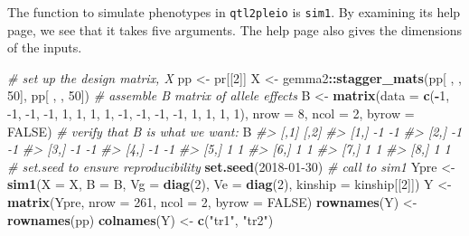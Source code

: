 \documentclass{book}
\newenvironment{Shaded}{\begin{snugshade}}{\end{snugshade}}
\newcommand{\CommentTok}[1]{\textcolor[rgb]{0.56,0.35,0.01}{\textit{#1}}}
\newcommand{\DataTypeTok}[1]{\textcolor[rgb]{0.13,0.29,0.53}{#1}}
\newcommand{\DecValTok}[1]{\textcolor[rgb]{0.00,0.00,0.81}{#1}}
\newcommand{\KeywordTok}[1]{\textcolor[rgb]{0.13,0.29,0.53}{\textbf{#1}}}
\newcommand{\NormalTok}[1]{#1}
\newcommand{\OperatorTok}[1]{\textcolor[rgb]{0.81,0.36,0.00}{\textbf{#1}}}
\newcommand{\OtherTok}[1]{\textcolor[rgb]{0.56,0.35,0.01}{#1}}
\newcommand{\StringTok}[1]{\textcolor[rgb]{0.31,0.60,0.02}{#1}}
\begin{document}
The function to simulate phenotypes in \texttt{qtl2pleio} is
\texttt{sim1}. By examining its help page, we see that it takes five
arguments. The help page also gives the dimensions of the inputs.

\begin{Shaded}
\begin{Highlighting}[]
\CommentTok{# set up the design matrix, X}
\NormalTok{pp <-}\StringTok{ }\NormalTok{pr[[}\DecValTok{2}\NormalTok{]]}
\NormalTok{X <-}\StringTok{ }\NormalTok{gemma2}\OperatorTok{::}\KeywordTok{stagger_mats}\NormalTok{(pp[ , , }\DecValTok{50}\NormalTok{], pp[ , , }\DecValTok{50}\NormalTok{])}
\CommentTok{# assemble B matrix of allele effects}
\NormalTok{B <-}\StringTok{ }\KeywordTok{matrix}\NormalTok{(}\DataTypeTok{data =} \KeywordTok{c}\NormalTok{(}\OperatorTok{-}\DecValTok{1}\NormalTok{, }\DecValTok{-1}\NormalTok{, }\DecValTok{-1}\NormalTok{, }\DecValTok{-1}\NormalTok{, }\DecValTok{1}\NormalTok{, }\DecValTok{1}\NormalTok{, }\DecValTok{1}\NormalTok{, }\DecValTok{1}\NormalTok{, }\DecValTok{-1}\NormalTok{, }\DecValTok{-1}\NormalTok{, }\DecValTok{-1}\NormalTok{, }\DecValTok{-1}\NormalTok{, }\DecValTok{1}\NormalTok{, }\DecValTok{1}\NormalTok{, }\DecValTok{1}\NormalTok{, }\DecValTok{1}\NormalTok{), }\DataTypeTok{nrow =} \DecValTok{8}\NormalTok{, }\DataTypeTok{ncol =} \DecValTok{2}\NormalTok{, }\DataTypeTok{byrow =} \OtherTok{FALSE}\NormalTok{)}
\CommentTok{# verify that B is what we want:}
\NormalTok{B}
\CommentTok{#>      [,1] [,2]}
\CommentTok{#> [1,]   -1   -1}
\CommentTok{#> [2,]   -1   -1}
\CommentTok{#> [3,]   -1   -1}
\CommentTok{#> [4,]   -1   -1}
\CommentTok{#> [5,]    1    1}
\CommentTok{#> [6,]    1    1}
\CommentTok{#> [7,]    1    1}
\CommentTok{#> [8,]    1    1}
\CommentTok{# set.seed to ensure reproducibility}
\KeywordTok{set.seed}\NormalTok{(}\DecValTok{2018-01-30}\NormalTok{)}
\CommentTok{# call to sim1}
\NormalTok{Ypre <-}\StringTok{ }\KeywordTok{sim1}\NormalTok{(}\DataTypeTok{X =}\NormalTok{ X, }\DataTypeTok{B =}\NormalTok{ B, }\DataTypeTok{Vg =} \KeywordTok{diag}\NormalTok{(}\DecValTok{2}\NormalTok{), }\DataTypeTok{Ve =} \KeywordTok{diag}\NormalTok{(}\DecValTok{2}\NormalTok{), }\DataTypeTok{kinship =}\NormalTok{ kinship[[}\DecValTok{2}\NormalTok{]])}
\NormalTok{Y <-}\StringTok{ }\KeywordTok{matrix}\NormalTok{(Ypre, }\DataTypeTok{nrow =} \DecValTok{261}\NormalTok{, }\DataTypeTok{ncol =} \DecValTok{2}\NormalTok{, }\DataTypeTok{byrow =} \OtherTok{FALSE}\NormalTok{)}
\KeywordTok{rownames}\NormalTok{(Y) <-}\StringTok{ }\KeywordTok{rownames}\NormalTok{(pp)}
\KeywordTok{colnames}\NormalTok{(Y) <-}\StringTok{ }\KeywordTok{c}\NormalTok{(}\StringTok{"tr1"}\NormalTok{, }\StringTok{"tr2"}\NormalTok{)}
\end{Highlighting}
\end{Shaded}
\end{document}
